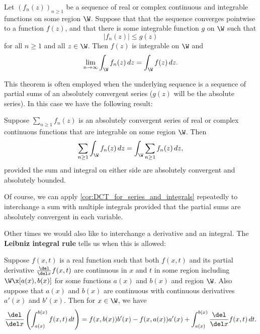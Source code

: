     \begin{theorem}
      Let $(f_{n}(z))_{n \ge 1}$ be a sequence of real or complex continuous and integrable functions on some region $\W$. Suppose that that the sequence converges pointwise to a function $f(z)$, and that there is some integrable function $g$ on $\W$ such that
      \[
        |f_{n}(z)| \le g(z)
      \]
      for all $n \ge 1$ and all $z \in \W$. Then $f(z)$ is integrable on $\W$ and
      \[
        \lim_{n \to \infty}\int_{\W}f_{n}(z)\,dz = \int_{\W}f(z)\,dz.
      \]
    \end{theorem}

    This theorem is often employed when the underlying sequence is a sequence of partial sums of an absolutely convergent series ($g(z)$ will be the absolute series). In this case we have the following result:

    \begin{corollary}\label{cor:DCT_for_series_and_integrals}
      Suppose $\sum_{n \ge 1}f_{n}(z)$ is an absolutely convergent series of real or complex continuous functions that are integrable on some region $\W$. Then
      \[
        \sum_{n \ge 1}\int_{\W}f_{n}(z)\,dz = \int_{\W}\sum_{n \ge 1}f_{n}(z)\,dz,
      \]
      provided the sum and integral on either side are absolutely convergent and absolutely bounded.
    \end{corollary}

    Of course, we can apply \cref{cor:DCT_for_series_and_integrals} repeatedly to interchange a sum with multiple integrals provided that the partial sums are absolutely convergent in each variable.

    Other times we would also like to interchange a derivative and an integral. The \textbf{Leibniz integral rule} tells us when this is allowed:

    \begin{theorem}
      Suppose $f(x,t)$ is a real function such that both $f(x,t)$ and its partial derivative $\frac{\del}{\del x}f(x,t)$ are continuous in $x$ and $t$ in some region including $\W \x [a(x),b(x)]$ for some functions $a(x)$ and $b(x)$ and region $\W$. Also suppose that $a(x)$ and $b(x)$ are continuous with continuous derivatives $a'(x)$ and $b'(x)$. Then for $x \in \W$, we have
      \[
        \frac{\del}{\del x}\left(\int_{a(x)}^{b(x)}f(x,t)\,dt\right) = f(x,b(x))b'(x)-f(x,a(x))a'(x)+\int_{a(x)}^{b(x)}\frac{\del}{\del x}f(x,t)\,dt.
      \]
    \end{theorem}
    
